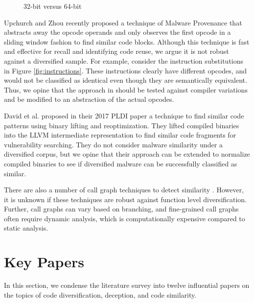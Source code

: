 \documentclass[preprint,12pt]{elsarticle}
\begin{document}
\begin{figure}[ht]
\centering{}
\caption{32-bit versus 64-bit}
\label{fig:32-64}
\end{figure}

Upchurch and Zhou \cite{upchurch2016malware} recently proposed a technique of Malware Provenance that abstracts away the opcode operands and only observes the first opcode in a sliding window fashion to find similar code blocks. Although this technique is fast and effective for recall and identifying code reuse, we argue it is not robust against a diversified sample. For example, consider the instruction substitutions in Figure \ref{fig:instructions}. These instructions clearly have different opcodes, and would not be classified as identical even though they are semantically equivalent. Thus, we opine that the approach in \cite{upchurch2016malware} should be tested against compiler variations and be modified to an abstraction of the actual opcodes.

David et al. \cite{david2017similarity} proposed in their 2017 PLDI paper a technique to find similar code patterns using binary lifting and reoptimization. They lifted compiled binaries into the LLVM intermediate representation to find similar code fragments for vulnerability searching. They do not consider malware similarity under a diversified corpus, but we opine that their approach can be extended to normalize compiled binaries to see if diversified malware can be successfully classified as similar.

There are also a number of call graph techniques to detect similarity \cite{jang2014mal} \cite {singh2017malware} \cite{hassen2017scalable}. However, it is unknown if these techniques are robust against function level diversification. Further, call graphs can vary based on branching, and fine-grained call graphs often require dynamic analysis, which is computationally expensive compared to static analysis.

\section{Key Papers}

In this section, we condense the literature survey into twelve influential papers on the topics of code diversification, deception, and code similarity.
\end{document}
